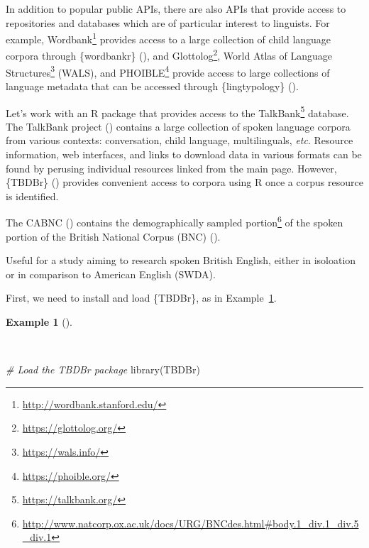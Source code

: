 \documentclass[
  letterpaper,
  krantz1]{latex/krantz-mod}
\newenvironment{Shaded}{\begin{snugshade}}{\end{snugshade}}
\newcommand{\CommentTok}[1]{\textcolor[rgb]{0.00,0.00,0.00}{\textit{#1}}}
\newcommand{\FunctionTok}[1]{\textcolor[rgb]{0.00,0.00,0.00}{#1}}
\newcommand{\NormalTok}[1]{\textcolor[rgb]{0.00,0.00,0.00}{#1}}
\theoremstyle{definition}
\newtheorem{example}{Example}[chapter]
\theoremstyle{definition}
\theoremstyle{remark}
\DeclareRobustCommand{\href}[2]{#2\footnote{\url{#1}}}
\begin{document}
In addition to popular public APIs, there are also APIs that provide
access to repositories and databases which are of particular interest to
linguists. For example, \href{http://wordbank.stanford.edu/}{Wordbank}
provides access to a large collection of child language corpora through
\{wordbankr\} (), and
\href{https://glottolog.org/}{Glottolog},
\href{https://wals.info/}{World Atlas of Language Structures} (WALS),
and \href{https://phoible.org/}{PHOIBLE} provide access to large
collections of language metadata that can be accessed through
\{lingtypology\} ().

Let's work with an R package that provides access to the
\href{https://talkbank.org/}{TalkBank} database. The TalkBank project
() contains a large
collection of spoken language corpora from various contexts:
conversation, child language, multilinguals, \emph{etc}. Resource
information, web interfaces, and links to download data in various
formats can be found by perusing individual resources linked from the
main page. However, \{TBDBr\} () provides convenient access to corpora using R once a
corpus resource is identified.

The CABNC () contains the
\href{http://www.natcorp.ox.ac.uk/docs/URG/BNCdes.html\#body.1_div.1_div.5_div.1}{demographically
sampled portion} of the spoken portion of the British National Corpus
(BNC) ().

Useful for a study aiming to research spoken British English, either in
isoloation or in comparison to American English (SWDA).

First, we need to install and load \{TBDBr\}, as in
Example~\ref{exm-acquire-load-pacman}.

\begin{example}[]\protect\hypertarget{exm-acquire-load-pacman}{}\label{exm-acquire-load-pacman}

~

\begin{Shaded}
\begin{Highlighting}[numbers=left,,]
\CommentTok{\# Load the TBDBr package}
\FunctionTok{library}\NormalTok{(TBDBr)}
\end{Highlighting}
\end{Shaded}

\end{example}
\end{document}
